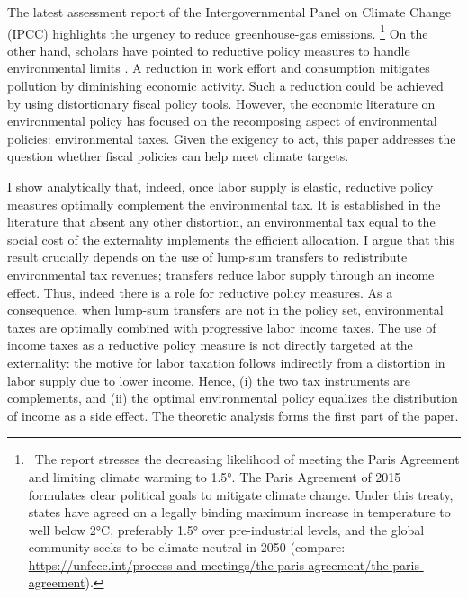The latest assessment report of the Intergovernmental Panel on Climate Change (IPCC) \citep{IPCC2022} highlights the urgency to reduce greenhouse-gas emissions.%
\footnote{ \  The report stresses the decreasing likelihood of meeting the Paris Agreement and limiting climate warming to 1.5°. The Paris Agreement of 2015 formulates clear political goals to mitigate climate change. Under this treaty, states have agreed on a legally binding maximum increase in temperature to well below 2°C, preferably 1.5° over pre-industrial levels, and the global community seeks to be climate-neutral in 2050  (compare: \url{https://unfccc.int/process-and-meetings/the-paris-agreement/the-paris-agreement}). 
}
On the other hand, scholars have pointed to reductive policy measures to handle environmental limits \citep{Arrow2004AreMuch, Schor2005SustainableReduction, Dasgupta2021}. A reduction in work effort and consumption mitigates pollution by diminishing economic activity. Such a reduction could be achieved by using distortionary fiscal policy tools.
However, the economic literature on environmental policy has focused on the recomposing aspect of environmental policies: environmental taxes. %
Given the exigency to act, this paper addresses the question whether fiscal policies can help meet climate targets.

I show analytically that, indeed, once 
labor supply is elastic, reductive policy measures optimally complement the environmental tax. 
It is established in the literature that absent any other distortion, an environmental tax equal to the social cost of the externality implements the efficient allocation. 
I argue that this result crucially depends on the use of lump-sum transfers to redistribute environmental tax revenues; transfers reduce labor supply through an income effect. Thus, indeed there is a role for reductive policy measures. 
 As a consequence,  when lump-sum transfers are not in the policy set, environmental taxes are optimally combined with progressive labor income taxes. The use of income taxes as a reductive policy measure is not directly targeted at the externality: the motive for labor taxation follows indirectly from a distortion in labor supply due to lower income. Hence, (i) the two tax instruments are complements, and %
(ii) the optimal environmental policy equalizes the distribution of income as  a side effect. The theoretic analysis forms the first part of the paper.

